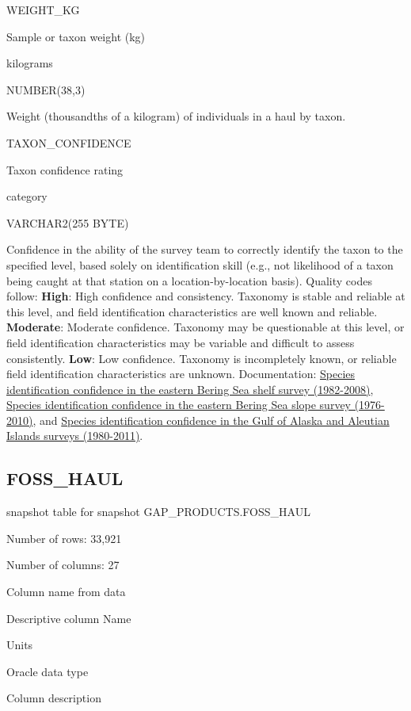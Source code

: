 \documentclass[
  letterpaper,
  oneside,
  open=any]{scrbook}
\begin{document}
WEIGHT\_KG

Sample or taxon weight (kg)

kilograms

NUMBER(38,3)

Weight (thousandths of a kilogram) of individuals in a haul by taxon.

TAXON\_CONFIDENCE

Taxon confidence rating

category

VARCHAR2(255 BYTE)

Confidence in the ability of the survey team to correctly identify the
taxon to the specified level, based solely on identification skill
(e.g., not likelihood of a taxon being caught at that station on a
location-by-location basis). Quality codes follow: \textbf{High}: High
confidence and consistency. Taxonomy is stable and reliable at this
level, and field identification characteristics are well known and
reliable. \textbf{Moderate}: Moderate confidence. Taxonomy may be
questionable at this level, or field identification characteristics may
be variable and difficult to assess consistently. \textbf{Low}: Low
confidence. Taxonomy is incompletely known, or reliable field
identification characteristics are unknown. Documentation:
\href{http://apps-afsc.fisheries.noaa.gov/Publications/ProcRpt/PR2009-04.pdf}{Species
identification confidence in the eastern Bering Sea shelf survey
(1982-2008)},
\href{http://apps-afsc.fisheries.noaa.gov/Publications/ProcRpt/PR2014-05.pdf}{Species
identification confidence in the eastern Bering Sea slope survey
(1976-2010)}, and
\href{http://apps-afsc.fisheries.noaa.gov/Publications/ProcRpt/PR2014-01.pdf}{Species
identification confidence in the Gulf of Alaska and Aleutian Islands
surveys (1980-2011)}.

\subsection{FOSS\_HAUL}\label{foss_haul}

snapshot table for snapshot GAP\_PRODUCTS.FOSS\_HAUL

Number of rows: 33,921

Number of columns: 27

Column name from data

Descriptive column Name

Units

Oracle data type

Column description
\end{document}
